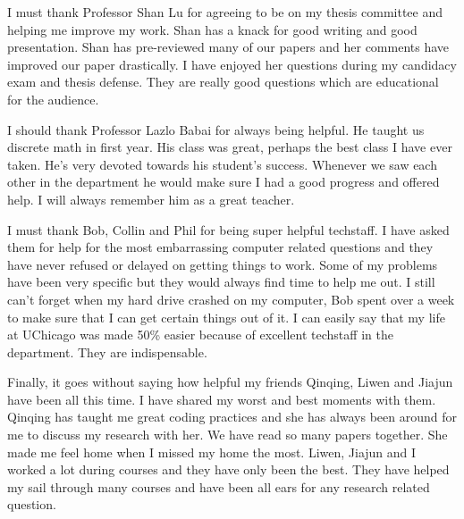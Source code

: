 I must thank Professor Shan Lu for agreeing to be on my thesis committee and helping me improve my work.
Shan has a knack for good writing and good presentation. Shan has pre-reviewed many of our
papers and her comments have improved our paper drastically. I have enjoyed her questions
during my candidacy exam and thesis defense. They are really good questions which are educational for the audience.

I should thank Professor Lazlo Babai for always being helpful. He taught us discrete math in first year. His class was
great, perhaps the best class I have ever taken. He's very devoted towards his student's success. Whenever we
saw each other in the department he would make sure I had a good progress and offered help. I will always remember
him as a great teacher.

I must thank Bob, Collin and Phil for being super helpful techstaff. I have asked them for help for the most
embarrassing computer related questions and they have never refused or delayed on getting things to work.
 Some of my problems have been very specific but they would
always find time to help me out. I still can't forget when my hard drive crashed on my computer,
Bob spent over a week to make sure that I can get certain things out of it. I can easily say that my life at
UChicago was made 50\% easier because of excellent techstaff in the department. They are indispensable.

Finally, it goes without saying how helpful my friends Qinqing, Liwen and Jiajun have been all this time.
I have shared my worst and best moments with them. Qinqing has taught me great coding practices and she has
always been around for me to discuss my research with her. We have read so many papers together. She made me feel home
when I missed my home the most. Liwen, Jiajun and I worked a lot during courses and
they have only been the best. They have helped my sail through many courses and have been all ears for any research related question.
